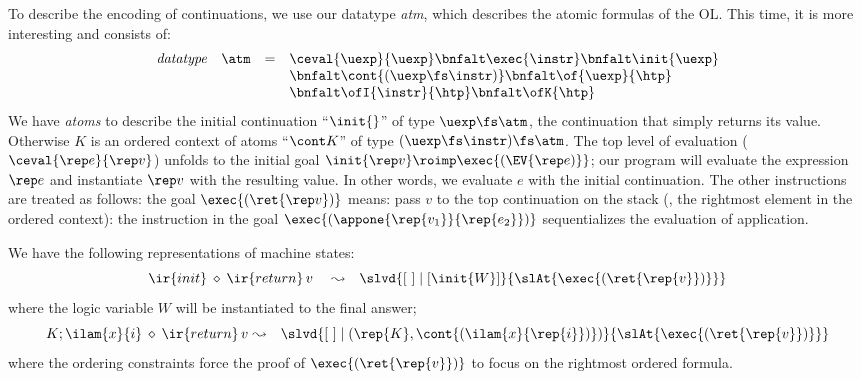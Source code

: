 \documentclass[final]{svjour3}
\begin{document}
To describe the encoding of continuations,
we  use our datatype \textit{atm},  which describes the atomic formulas
of the OL\@. This time, it is more interesting and consists of:
\[ \begin{array}{rrcl}
\mbox{\textit{datatype}}& \atm & = & \ceval{\uexp}{\Val}\bnfalt
\exec{\instr}\bnfalt\init{\Val}\\
& & &\bnfalt\cont{(\Val\fs\instr)}\bnfalt
 \of{\uexp}{\htp}\\
& & &\bnfalt\ofI{\instr}{\htp}
\bnfalt\ofK{\htp}
\end{array} \] 
We have \emph{atoms} to describe the initial continuation ``$\init{}$'' of
type $\Val\fs\atm$, the continuation that simply returns its
value. Otherwise $K$ is an ordered context of atoms ``$\cont K$'' of
type  $(\Val\fs\instr)\fs\atm$.  The top level of evaluation
($\ceval{\rep e}{\rep v}$)  unfolds to 
the initial goal $\init{\rep v} \roimp \exec{(\EV {\rep e)}}$; our program will
evaluate the expression $\rep e$ and instantiate $\rep v$ with the resulting
value.  In other words, we  evaluate $e$ with the
initial continuation. The  other instructions are treated as follows:
the goal $\exec{(\ret {\rep v})} $ means: pass $v$ to
the top continuation on the stack (\ie, the rightmost element in the
ordered context): the instruction in the goal $\exec{(\appone{\rep
    {v_1}}{\rep {e_2}})}$ sequentializes the evaluation of application.

We have the following representations of machine states:
\[
\ir{init}\:\diamond\:\ir{return}\,v 
\quad \mbox{ $\leadsto$} \quad
\slvd{\elist\coln[ \init{W}]} { \slAt {\exec{(\ret {\rep{v}})}}}
\]
where the logic variable $W$ will be instantiated to the final answer;
\[
K;\ilam{x}{i}\:\diamond\:\ir{return}\,v
\mbox{ $\leadsto$} \quad
\slvd{\elist\coln(\rep{K}, \cont{( \ilam{x}{\rep{i}})})} {\slAt{\exec{(\ret {\rep{v}})}}}
\]
where the ordering constraints force the proof of $\exec{(\ret{\rep{v}})}$ to
focus on the rightmost ordered formula. 
\end{document}

